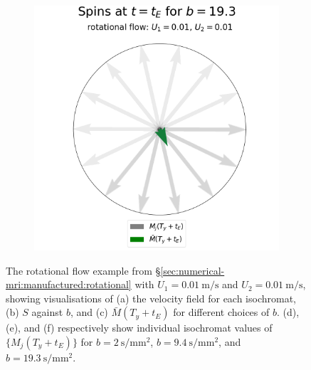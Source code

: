 \begin{figure}
\begin{subfigure}{0.4\textwidth}
                    \caption{}
                    \label{fig:mri-rotational:spins_min}
                \end{subfigure}
                \begin{subfigure}{0.4\textwidth}
                    \centering
                    \includegraphics[width=\textwidth]{diagrams/results-mri/simple-tests/mri-spins_avg_2D_rotational_test_4_b19.3.png}
                    \caption{}
                    \label{fig:mri-rotational:spins_max}
                \end{subfigure}
                \caption{The rotational flow example from \S\ref{sec:numerical-mri:manufactured:rotational} with $U_1 = \qty{0.01}{\metre\per\second}$ and $U_2 = \qty{0.01}{\metre\per\second}$, showing visualisations of (a) the velocity field for each isochromat, (b) $S$ against $b$, and (c) $\bar{M}(T_y + t_E)$ for different choices of $b$. (d), (e), and (f) respectively show individual isochromat values of $\{ M_j(T_y + t_E) \}$ for $b=\qty{2}{\second\per\milli\metre^2}$, $b=\qty{9.4}{\second\per\milli\metre^2}$, and $b=\qty{19.3}{\second\per\milli\metre^2}$.}
                \label{fig:mri-rotational}
            \end{figure}


